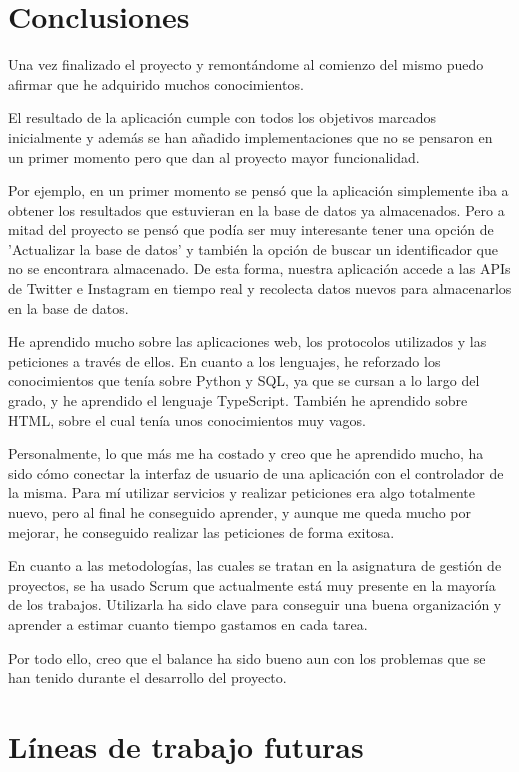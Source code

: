
\section{Conclusiones}
Una vez finalizado el proyecto  y remontándome al comienzo del mismo puedo afirmar que he adquirido muchos conocimientos.

El resultado de la aplicación cumple con todos los objetivos marcados inicialmente y además se han añadido implementaciones que no se pensaron en un primer momento pero que dan al proyecto mayor funcionalidad.

Por ejemplo, en un primer momento se pensó que la aplicación simplemente iba a obtener los resultados que estuvieran en la base de datos ya almacenados. Pero a mitad del proyecto se pensó que podía ser muy interesante tener una opción de 'Actualizar la base de datos' y también la opción de buscar un identificador que no se encontrara almacenado.
De esta forma, nuestra aplicación accede a las APIs de Twitter e Instagram en tiempo real y recolecta datos nuevos para almacenarlos en la base de datos.

He aprendido mucho sobre las aplicaciones web, los protocolos utilizados y las peticiones a través de ellos. En cuanto a los lenguajes, he reforzado los conocimientos que tenía sobre Python y SQL, ya que se cursan a lo largo del grado, y he aprendido el lenguaje TypeScript. También he aprendido sobre HTML, sobre el cual tenía unos conocimientos muy vagos.

Personalmente, lo que más me ha costado y creo que he aprendido mucho, ha sido cómo conectar la interfaz de usuario de una aplicación con el controlador de la misma. Para mí utilizar servicios y realizar peticiones era algo totalmente nuevo, pero al final he conseguido aprender, y aunque me queda mucho por mejorar, he conseguido realizar las peticiones de forma exitosa.

En cuanto a las metodologías, las cuales se tratan en la asignatura de gestión de proyectos, se ha usado Scrum que actualmente está muy presente en la mayoría de los trabajos. Utilizarla ha sido clave para conseguir una buena organización y aprender a estimar cuanto tiempo gastamos en cada tarea.

Por todo ello, creo que el balance ha sido bueno aun con los problemas que se han tenido durante el desarrollo del proyecto.

\section{Líneas de trabajo futuras}

